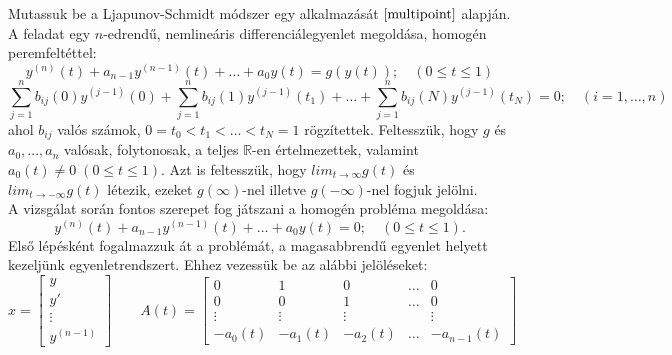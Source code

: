 \documentclass[oneside, titlepage, 12pt, a4paper]{report}
\begin{document}
Mutassuk be a Ljapunov-Schmidt módszer egy alkalmazását $\cite{multipoint}$ alapján. A feladat egy $n$-edrendű, nemlineáris differenciálegyenlet megoldása, homogén peremfeltéttel:
\begin{equation}
y^{(n)}(t) + a_{n-1} y^{(n-1)}(t) + \dots + a_0 y(t) = g(y(t)); \quad (0 \leq t \leq 1) \label{eq:mp:inhomOG}
\end{equation}
\begin{equation}
\sum_{j = 1}^n b_{ij}(0) y^{(j-1)}(0) + \sum_{j = 1}^n b_{ij}(1) y^{(j-1)}(t_1) + \dots + \sum_{j = 1}^n b_{ij}(N) y^{(j-1)}(t_N) = 0; \quad (i = 1, \dots, n) \label{eq:mp:boundaryOG}
\end{equation}
ahol $b_{ij}$ valós számok, $0 = t_0 < t_1 < \dots < t_N = 1$ rögzítettek. Feltesszük, hogy $g$ és $a_0, \dots, a_n$ valósak, folytonosak, a teljes $\mathbb{R}$-en értelmezettek, valamint $a_0(t) \neq 0 \; (0 \leq t \leq 1)$. Azt is feltesszük, hogy $lim_{t \to \infty} g(t)$ és $lim_{t \to -\infty} g(t)$ létezik, ezeket $g(\infty)$-nel illetve $g(-\infty)$-nel fogjuk jelölni. \\
A vizsgálat során fontos szerepet fog játszani a homogén probléma megoldása:
\begin{equation}
y^{(n)}(t) + a_{n-1} y^{(n-1)}(t) + \dots + a_0 y(t) = 0; \quad (0 \leq t \leq 1) \label{eq:mp:homOG}.
\end{equation}
Első lépésként fogalmazzuk át a problémát, a magasabbrendű egyenlet helyett kezeljünk egyenletrendszert. Ehhez vezessük be az alábbi jelöléseket:
\begin{equation*}
x =
	\begin{bmatrix}
		y \\ y' \\ \vdots \\ y^{(n-1)}
	\end{bmatrix}
\qquad
A(t) =
	\begin{bmatrix}
		0 & 1 & 0 & \dots & 0 \\
		0 & 0 & 1 & \dots & 0 \\
		\vdots & \vdots & \vdots && \vdots \\
		-a_0(t) & -a_1(t) & -a_2(t) & \dots & -a_{n-1}(t)
	\end{bmatrix}
\end{equation*}
\end{document}
